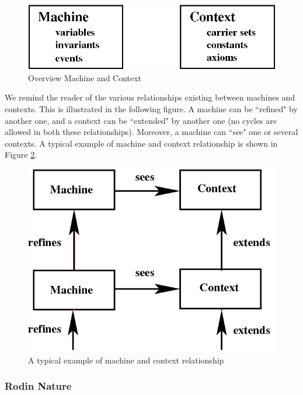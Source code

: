 \begin{figure}[!ht]
\begin{center}
	\includegraphics{img/reference/ref_10_project1.png}
	\caption{Overview Machine and Context}
	\label{fig_ref_10_project1}
\end{center}
\end{figure}

We remind the reader of the various relationships existing between machines and contexts. This is illustrated in the following figure. A machine can be ``refined" by another one, and a context can be ``extended" by another one (no cycles are allowed in both these relationships). Moreover, a machine can ``see" one or several contexts. A typical example of machine and context relationship is shown in Figure \ref{fig_ref_10_project2}. 

\begin{figure}[!ht]
\begin{center}
	\includegraphics{img/reference/ref_10_project2.png}
	\caption{A typical example of machine and context relationship}
	\label{fig_ref_10_project2}
\end{center}
\end{figure}

\subsubsection{Rodin Nature}
\label{rodin_nature}

